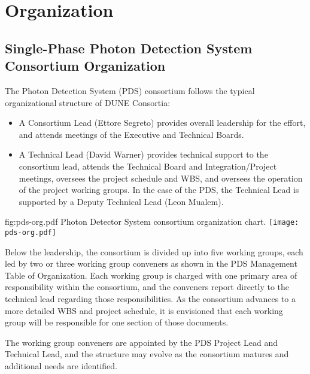 \section{Organization}
\label{sec:fdsp-pd-org}

\subsection{Single-Phase Photon Detection System Consortium Organization}
\label{sec:fdsp-pd-org-consortium}


The Photon Detection System (PDS) consortium follows the typical organizational structure of DUNE Consortia:
\begin{itemize}
\item A Consortium Lead (Ettore Segreto) provides overall leadership for the effort, and attends meetings of the Executive and Technical Boards.
\item A Technical Lead (David Warner) provides technical support to the consortium lead, attends the Technical Board and Integration/Project meetings, oversees the project schedule and WBS, and oversees the operation of the project working groups.  In the case of the PDS, the Technical Lead is supported by a Deputy Technical Lead (Leon Mualem).
\end{itemize}

\begin{dunefigure}{fig:pds-org.pdf}
{Photon Detector System consortium organization chart.}
 \texttt{[image: pds-org.pdf]}
\end{dunefigure}

Below the leadership, the consortium is divided up into five working groups, each led by two or three working group conveners as shown in the PDS Management Table of Organization.  Each working group is charged with one primary area of responsibility within the consortium, and the conveners report directly to the technical lead regarding those responsibilities.  As the consortium advances to a more detailed WBS and project schedule, it is envisioned that each working group will be responsible for one section of those documents.

The working group conveners are appointed by the PDS Project Lead and Technical Lead, and the structure may evolve as the consortium matures and additional needs are identified. 

